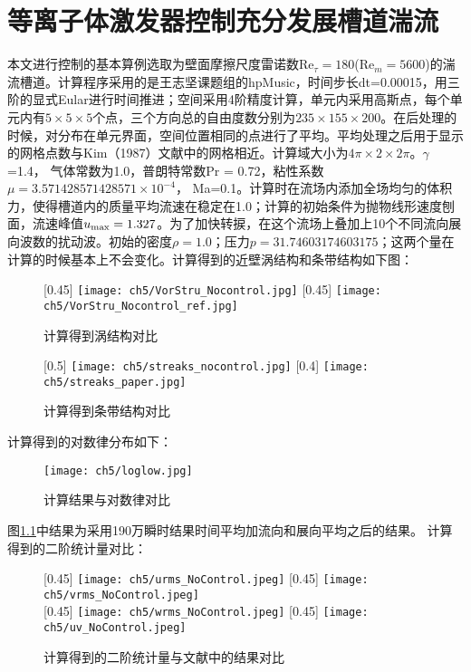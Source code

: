 \chapter{等离子体激发器控制充分发展槽道湍流}
本文进行控制的基本算例选取为壁面摩擦尺度雷诺数Re$_\tau=180$(Re$_m=5600$)的湍流槽道。计算程序采用的是王志坚课题组的hpMusic\cite{Wang1111}，时间步长dt=0.00015，用三阶的显式Eular进行时间推进；空间采用4阶精度计算，单元内采用高斯点，每个单元内有$5\times5\times5$个点，三个方向总的自由度数分别为$235\times155\times200$。在后处理的时候，对分布在单元界面，空间位置相同的点进行了平均。平均处理之后用于显示的网格点数与Kim（1987）\cite{Kim1987}文献中的网格相近。计算域大小为$4\pi \times 2\times 2\pi$。$\gamma$=1.4， 气体常数为1.0，普朗特常数Pr = 0.72，粘性系数 $\mu=3.571428571428571\times10^{-4}$， Ma=0.1。计算时在流场内添加全场均匀的体积力，使得槽道内的质量平均流速在稳定在1.0；计算的初始条件为抛物线形速度刨面，流速峰值$u_{\rm max} = 1.327$。为了加快转捩，在这个流场上叠加上10个不同流向展向波数的扰动波。初始的密度$\rho=1.0$；压力$p= 31.74603174603175$；这两个量在计算的时候基本上不会变化。计算得到的近壁涡结构和条带结构如下图：
\begin{figure}[h]
  \centering
  [0.45\textwidth] %
    {\texttt{[image: ch5/VorStru\_Nocontrol.jpg]}}%
  [0.45\textwidth]
    {\texttt{[image: ch5/VorStru\_Nocontrol\_ref.jpg]}}%
  \caption{计算得到涡结构对比}
\end{figure}
\begin{figure}[h]
  \centering
  [0.5\textwidth] %
    {\texttt{[image: ch5/streaks\_nocontrol.jpg]}}%
  [0.4\textwidth]
    {\texttt{[image: ch5/streaks\_paper.jpg]}}%
  \caption{计算得到条带结构对比}
\end{figure}
计算得到的对数律分布如下：
\begin{figure}
  \centering
  \texttt{[image: ch5/loglow.jpg]}
  \caption{计算结果与对数律对比}\label{f:loglow}
\end{figure}
图\ref{f:loglow}中结果为采用190万瞬时结果时间平均加流向和展向平均之后的结果。
计算得到的二阶统计量对比：
\begin{figure}[h]
  \centering
  [0.45\textwidth] %
    {\texttt{[image: ch5/urms\_NoControl.jpeg]}}%
  [0.45\textwidth]
    {\texttt{[image: ch5/vrms\_NoControl.jpeg]}}%
  \\\bigskip
  [0.45\textwidth] %
    {\texttt{[image: ch5/wrms\_NoControl.jpeg]}}%
  [0.45\textwidth]
    {\texttt{[image: ch5/uv\_NoControl.jpeg]}}%
  \caption{计算得到的二阶统计量与文献中的结果对比}
\end{figure}
